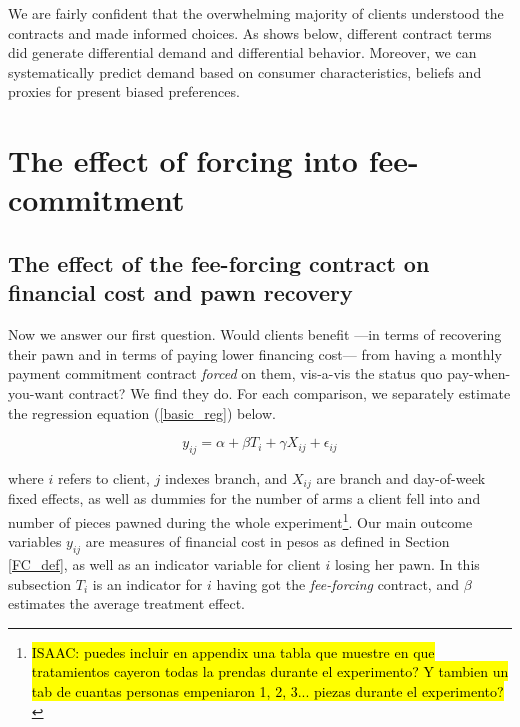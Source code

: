 \documentclass[11pt]{article}
\begin{document}
We are fairly confident that the overwhelming majority of clients understood the contracts and made informed choices. As shows below, different contract terms did generate differential demand and differential behavior. Moreover, we can systematically predict demand based on consumer characteristics, beliefs and proxies for present biased preferences.



\section{The effect of forcing into fee-commitment} \label{fee-commitment}



\subsection{The effect of the fee-forcing contract on financial cost and pawn recovery} \label{TE_fee-forcing}

Now we answer our first question. Would clients benefit ---in terms of recovering their pawn and in terms of paying lower financing cost--- from having a monthly payment commitment contract \textit{forced} on them, vis-a-vis the status quo pay-when-you-want contract? We find they do. For each comparison, we separately estimate the regression equation (\ref{basic_reg}) below.

\begin{equation} \label{basic_reg}
    y_{ij} = \alpha + \beta T_{i} + \gamma X_{ij} + \epsilon_{ij}
\end{equation}

\noindent where $i$ refers to client, $j$ indexes branch, and $X_{ij}$ are branch and day-of-week fixed effects, as well as dummies for the number of arms a client fell into and number of pieces pawned during the whole experiment\footnote{\hl{ISAAC: puedes incluir en appendix una tabla que muestre en que tratamientos cayeron todas la prendas durante el experimento? Y tambien un tab de cuantas personas empeniaron 1, 2, 3... piezas durante el experimento?}}. Our main outcome variables $y_{ij}$ are measures of financial cost in pesos as defined in Section \ref{FC_def}, as well as an indicator variable for client $i$ losing her pawn. In this subsection $T_{i}$ is an indicator for $i$ having got the \textit{fee-forcing} contract, and $\beta$ estimates the average treatment effect.%
\end{document}
